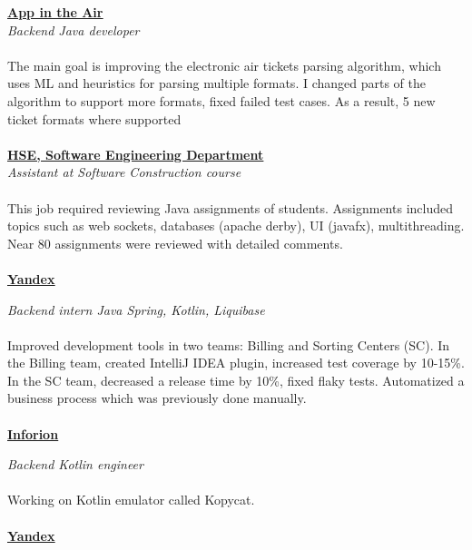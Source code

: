 \documentclass{article}
\begin{document}
\noindent\href{https://www.appintheair.mobi/}{{\textbf{\underline{App in the Air}}}}
\\\noindent\textit{Backend Java developer}
\\\\
\noindent The main goal is improving the electronic air tickets parsing algorithm, which uses ML and heuristics
for parsing multiple formats. I changed parts of the algorithm to support more formats, fixed failed test
cases. As a result, 5 new ticket formats where supported
\\\\
\noindent\href{https://cs.hse.ru/en/dse/}{{\textbf{\underline{HSE, Software Engineering Department}}}}
\\\textit{Assistant at Software Construction course}
\\\\
\noindent  This job required reviewing Java assignments of students. Assignments included topics such as web sockets,
databases (apache derby), UI (javafx), multithreading. Near 80 assignments were reviewed with detailed
comments.
\\\\
\noindent\href{https://yandex.com/}{{\textbf{\underline{Yandex}}}}

\noindent \textit{Backend intern Java Spring, Kotlin, Liquibase}
\\\\
\noindent Improved development tools in two teams: Billing and Sorting Centers (SC). In the Billing team, created
IntelliJ IDEA plugin, increased test coverage by 10-15\%. In the SC team, decreased a release time by
10\%, fixed flaky tests. Automatized a business process which was previously done manually.
\\\\
\noindent\href{https://inforion.ru/}{{\textbf{\underline{Inforion}}}}

\noindent \textit{Backend Kotlin engineer}
\\\\
\noindent Working on Kotlin emulator called Kopycat.
\\\\
\noindent\href{https://yandex.com/}{{\textbf{\underline{Yandex}}}}
\end{document}
